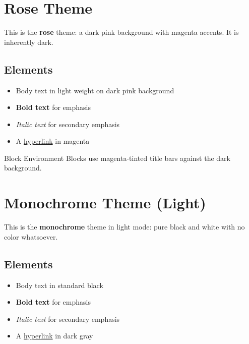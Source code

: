 \documentclass[
    language=english,
    doctype=article,
    institution=none,
    titlestyle=simple,
]{../../omnilatex}
\begin{document}
\section{Rose Theme}


This is the \textbf{rose} theme: a dark pink background with magenta accents.
It is inherently dark.

\subsection{Elements}

\begin{itemize}
    \item Body text in light weight on dark pink background
    \item \textbf{Bold text} for emphasis
    \item \textit{Italic text} for secondary emphasis
    \item A \href{https://github.com/WyattAu/OmniLaTeX-template}{hyperlink} in magenta
\end{itemize}

\begin{block}{Block Environment}
    Blocks use magenta-tinted title bars against the dark background.
\end{block}

\newpage


\section{Monochrome Theme (Light)}


This is the \textbf{monochrome} theme in light mode: pure black and white
with no color whatsoever.

\subsection{Elements}

\begin{itemize}
    \item Body text in standard black
    \item \textbf{Bold text} for emphasis
    \item \textit{Italic text} for secondary emphasis
    \item A \href{https://github.com/WyattAu/OmniLaTeX-template}{hyperlink} in dark gray
\end{itemize}
\end{document}
